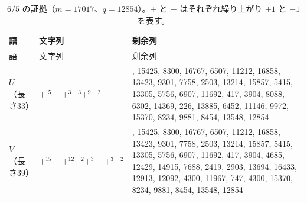 \documentclass[11pt,reqno]{amsart}
\theoremstyle{definition}
\theoremstyle{definition}
\theoremstyle{remark}
\begin{document}

\begingroup
\small
\setlength{\tabcolsep}{4pt}
\renewcommand{\arraystretch}{1.15}
\setlength{\LTcapwidth}{\textwidth}
\begin{longtable}{@{}>{\raggedright\arraybackslash}p{} >{\raggedright\arraybackslash}p{} >{\raggedright\arraybackslash}p{}@{}}
\caption{\(6/5\) の証拠（\(m=17017\)、\(q=12854\)）。\(+\) と \(-\) はそれぞれ繰り上がり \(+1\) と \(-1\) を表す。}\label{tab:15}\\
\toprule
語 & 文字列 & 剰余列 \\
\midrule
\endfirsthead
\toprule
語 & 文字列 & 剰余列 \\
\midrule
\endhead
\bottomrule
\endlastfoot
\(U\) （長さ33） & \(+^{15}-+^{3}-^{3}+^{9}-^{2}\) & 12854,\allowbreak{} 15425,\allowbreak{} 8300,\allowbreak{} 16767,\allowbreak{} 6507,\allowbreak{} 11212,\allowbreak{} 16858,\allowbreak{} 13423,\allowbreak{} 9301,\allowbreak{} 7758,\allowbreak{} 2503,\allowbreak{} 13214,\allowbreak{} 15857,\allowbreak{} 5415,\allowbreak{} 13305,\allowbreak{} 5756,\allowbreak{} 6907,\allowbreak{} 11692,\allowbreak{} 417,\allowbreak{} 3904,\allowbreak{} 8088,\allowbreak{} 6302,\allowbreak{} 14369,\allowbreak{} 226,\allowbreak{} 13885,\allowbreak{} 6452,\allowbreak{} 11146,\allowbreak{} 9972,\allowbreak{} 15370,\allowbreak{} 8234,\allowbreak{} 9881,\allowbreak{} 8454,\allowbreak{} 13548,\allowbreak{} 12854 \\*
\(V\) （長さ39） & \(+^{15}-+^{12}-^{2}+^{3}-+^{3}-^{2}\) & 12854,\allowbreak{} 15425,\allowbreak{} 8300,\allowbreak{} 16767,\allowbreak{} 6507,\allowbreak{} 11212,\allowbreak{} 16858,\allowbreak{} 13423,\allowbreak{} 9301,\allowbreak{} 7758,\allowbreak{} 2503,\allowbreak{} 13214,\allowbreak{} 15857,\allowbreak{} 5415,\allowbreak{} 13305,\allowbreak{} 5756,\allowbreak{} 6907,\allowbreak{} 11692,\allowbreak{} 417,\allowbreak{} 3904,\allowbreak{} 4685,\allowbreak{} 12429,\allowbreak{} 14915,\allowbreak{} 7688,\allowbreak{} 2419,\allowbreak{} 2903,\allowbreak{} 13694,\allowbreak{} 16433,\allowbreak{} 12913,\allowbreak{} 12092,\allowbreak{} 4300,\allowbreak{} 11967,\allowbreak{} 747,\allowbreak{} 4300,\allowbreak{} 15370,\allowbreak{} 8234,\allowbreak{} 9881,\allowbreak{} 8454,\allowbreak{} 13548,\allowbreak{} 12854 \\
\end{longtable}
\endgroup
\end{document}
